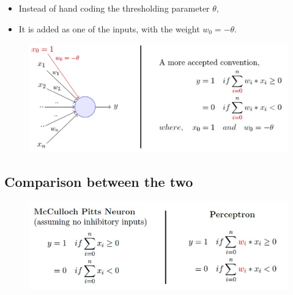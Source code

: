 \documentclass[
  letterpaper,
  DIV=11,
  numbers=noendperiod]{scrartcl}
\providecommand{\tightlist}{%
  \setlength{\itemsep}{0pt}\setlength{\parskip}{0pt}}\usepackage{longtable,booktabs,array}
\begin{document}
\begin{itemize}
\tightlist
\item
  Instead of hand coding the thresholding parameter \(\theta\),
\item
  It is added as one of the inputs, with the weight \(w_0=-\theta\).
\end{itemize}

\begin{figure}

{\centering 

\href{https://towardsdatascience.com/perceptron-the-artificial-neuron-4d8c70d5cc8d}{\includegraphics[width=1\textwidth,height=\textheight]{images/RosenblattPerceptron2.png}}

}

\end{figure}

\hypertarget{comparison-between-the-two}{%
\subsection{Comparison between the
two}\label{comparison-between-the-two}}

\begin{figure}

{\centering 

\href{https://towardsdatascience.com/perceptron-the-artificial-neuron-4d8c70d5cc8d}{\includegraphics[width=1\textwidth,height=\textheight]{images/McCullaughVSRosenblattPerceptron.png}}

}

\end{figure}
\end{document}
